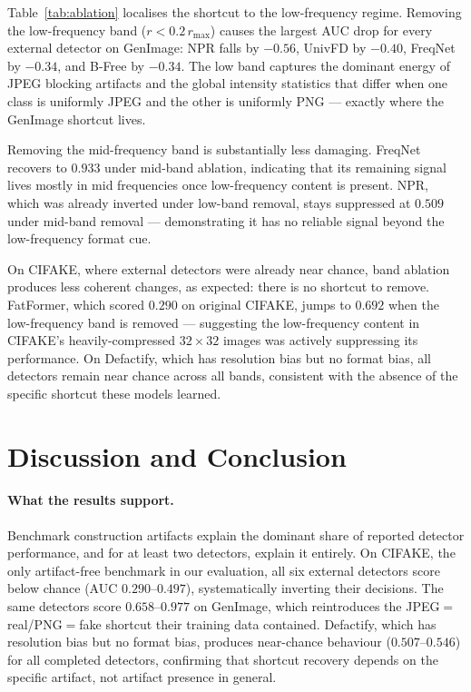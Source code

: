 \documentclass{bmvc2k}
\begin{document}
Table~\ref{tab:ablation} localises the shortcut to the low-frequency regime. Removing the low-frequency band ($r < 0.2\,r_{\max}$) causes the largest AUC drop for every external detector on GenImage: NPR falls by $-0.56$, UnivFD by $-0.40$, FreqNet by $-0.34$, and B-Free by $-0.34$. The low band captures the dominant energy of JPEG blocking artifacts and the global intensity statistics that differ when one class is uniformly JPEG and the other is uniformly PNG --- exactly where the GenImage shortcut lives.

Removing the mid-frequency band is substantially less damaging. FreqNet recovers to $0.933$ under mid-band ablation, indicating that its remaining signal lives mostly in mid frequencies once low-frequency content is present. NPR, which was already inverted under low-band removal, stays suppressed at $0.509$ under mid-band removal --- demonstrating it has no reliable signal beyond the low-frequency format cue.

On CIFAKE, where external detectors were already near chance, band ablation produces less coherent changes, as expected: there is no shortcut to remove. FatFormer, which scored $0.290$ on original CIFAKE, jumps to $0.692$ when the low-frequency band is removed --- suggesting the low-frequency content in CIFAKE's heavily-compressed $32\times32$ images was actively suppressing its performance. On Defactify, which has resolution bias but no format bias, all detectors remain near chance across all bands, consistent with the absence of the specific shortcut these models learned.

\section{Discussion and Conclusion}
\label{sec:conclusion}

\paragraph{What the results support.}
Benchmark construction artifacts explain the dominant share of reported detector performance, and for at least two detectors, explain it entirely. On CIFAKE, the only artifact-free benchmark in our evaluation, all six external detectors score below chance (AUC $0.290$--$0.497$), systematically inverting their decisions. The same detectors score $0.658$--$0.977$ on GenImage, which reintroduces the JPEG$=$real/PNG$=$fake shortcut their training data contained. Defactify, which has resolution bias but no format bias, produces near-chance behaviour ($0.507$--$0.546$) for all completed detectors, confirming that shortcut recovery depends on the specific artifact, not artifact presence in general.
\end{document}
